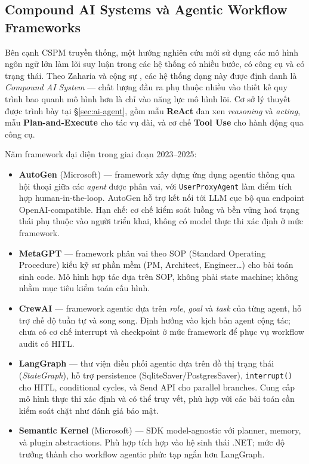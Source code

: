 \subsection{Compound AI Systems và Agentic Workflow Frameworks}
\label{subsec:rw-agentic}

Bên cạnh CSPM truyền thống, một hướng nghiên cứu mới sử dụng các mô hình ngôn ngữ lớn làm lõi suy luận trong các hệ thống có nhiều bước, có công cụ và có trạng thái. Theo Zaharia và cộng sự \cite{zaharia_compound_2024}, các hệ thống dạng này được định danh là \textit{Compound AI System} --- chất lượng đầu ra phụ thuộc nhiều vào thiết kế quy trình bao quanh mô hình hơn là chỉ vào năng lực mô hình lõi. Cơ sở lý thuyết được trình bày tại §\ref{sec:ai-agent}, gồm mẫu \textbf{ReAct} \cite{yao2023react} đan xen \textit{reasoning} và \textit{acting}, mẫu \textbf{Plan-and-Execute} cho tác vụ dài, và cơ chế \textbf{Tool Use} \cite{schick2023toolformer} cho hành động qua công cụ.

Năm framework đại diện trong giai đoạn 2023--2025:
\begin{itemize}
    \item \textbf{AutoGen} (Microsoft) \cite{microsoft2023autogen} --- framework xây dựng ứng dụng agentic thông qua hội thoại giữa các \textit{agent} được phân vai, với \texttt{UserProxyAgent} làm điểm tích hợp human-in-the-loop. AutoGen hỗ trợ kết nối tới LLM cục bộ qua endpoint OpenAI-compatible. Hạn chế: cơ chế kiểm soát luồng và bền vững hoá trạng thái phụ thuộc vào người triển khai, không có model thực thi xác định ở mức framework.
    \item \textbf{MetaGPT} \cite{hong2024metagpt} --- framework phân vai theo SOP (Standard Operating Procedure) kiểu kỹ sư phần mềm (PM, Architect, Engineer\dots) cho bài toán sinh code. Mô hình hợp tác dựa trên SOP, không phải state machine; không nhằm mục tiêu kiểm toán cấu hình.
    \item \textbf{CrewAI} \cite{crewai_2024} --- framework agentic dựa trên \textit{role}, \textit{goal} và \textit{task} của từng agent, hỗ trợ chế độ tuần tự và song song. Định hướng vào kịch bản agent cộng tác; chưa có cơ chế interrupt và checkpoint ở mức framework để phục vụ workflow audit có HITL.
    \item \textbf{LangGraph} \cite{langgraph2024} --- thư viện điều phối agentic dựa trên đồ thị trạng thái (\textit{StateGraph}), hỗ trợ persistence (SqliteSaver/PostgresSaver), \texttt{interrupt()} cho HITL, conditional cycles, và Send API cho parallel branches. Cung cấp mô hình thực thi xác định và có thể truy vết, phù hợp với các bài toán cần kiểm soát chặt như đánh giá bảo mật.
    \item \textbf{Semantic Kernel} (Microsoft) \cite{semantic_kernel_2024} --- SDK model-agnostic với planner, memory, và plugin abstractions. Phù hợp tích hợp vào hệ sinh thái .NET; mức độ trưởng thành cho workflow agentic phức tạp ngắn hơn LangGraph.
\end{itemize}

